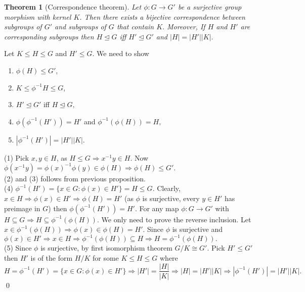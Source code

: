 \documentclass[11pt]{amsart}
\newtheorem{theorem}{Theorem}[section]
\begin{document}
\begin{theorem}[Correspondence theorem]
Let $\phi:G\to G'$ be a surjective group morphism with kernel $K$. Then there exists a bijective correspondence between subgroups of $G'$ and subgroups of $G$ that contain $K.$ Moreover, If $H$ and $H'$ are corresponding subgroups then $H\unlhd G$ iff $H'\unlhd G'$ and $|H|=|H'||K|.$
\end{theorem}
\proof Let $K\leq H\leq G$ and $H'\leq G$. We need to show \begin{enumerate}
\item $\phi(H)\leq G'$,
\item $K\leq \phi^{-1}H\leq G$,
\item $H'\unlhd G'$ iff $H\unlhd G,$
\item $\phi(\phi^{-1}(H'))=H'$ and $\phi^{-1}(\phi(H))=H,$
\item $|\phi^{-1}(H')|=|H'||K|.$
\end{enumerate} 
(1) Pick $x,y\in H$, as $H\leq G \Rightarrow x^{-1}y\in H.$ Now $\phi(x^{-1}y)=\phi(x)^{-1}\phi(y)\in \phi(H) \Rightarrow \phi(H)\leq G'.$\\
(2) and (3) follows from previous proposition.\\
(4) $\phi^{-1}(H')=\{x\in G:\phi(x)\in H'\}=H\leq G.$ Clearly, $x\in H \Rightarrow \phi(x)\in H' \Rightarrow \phi(H)=H'$ (as $\phi$ is surjective, every $y\in H'$ has preimage in $G$) then $\phi(\phi^{-1}(H'))=H'.$ For any map $\phi:G\to G'$ with $H\subseteq G \Rightarrow H\subseteq \phi^{-1}(\phi(H)).$ We only need to prove the reverse inclusion. Let $x\in \phi^{-1}(\phi(H)) \Rightarrow \phi(x)\in\phi(H)=H'.$ Since $\phi$ is surjective and $\phi(x)\in H' \Rightarrow x\in H \Rightarrow \phi^{-1}(\phi(H))\subseteq H\Rightarrow H=\phi^{-1}(\phi(H)).$\\
(5) Since $\phi$ is surjective, by first isomorphism theorem $G/K\cong G'.$ Pick $H'\leq G'$ then $H'$ is of the form $H/K$ for some $K\leq H\leq G$ where $H=\phi^{-1}(H')=\{x\in G:\phi(x)\in H'\} \Rightarrow |H'|=\dfrac{|H|}{|K|} \Rightarrow |H|=|H'||K| \Rightarrow |\phi^{-1}(H')|=|H'||K|.$ \qed
\end{document}
